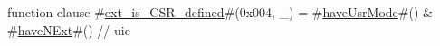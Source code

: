 function clause #\hyperref[sailRISCVzextzyiszyCSRzydefined]{ext\_is\_CSR\_defined}#(0x004, _) = #\hyperref[sailRISCVzhaveUsrMode]{haveUsrMode}#() & #\hyperref[sailRISCVzhaveNExt]{haveNExt}#() // uie
